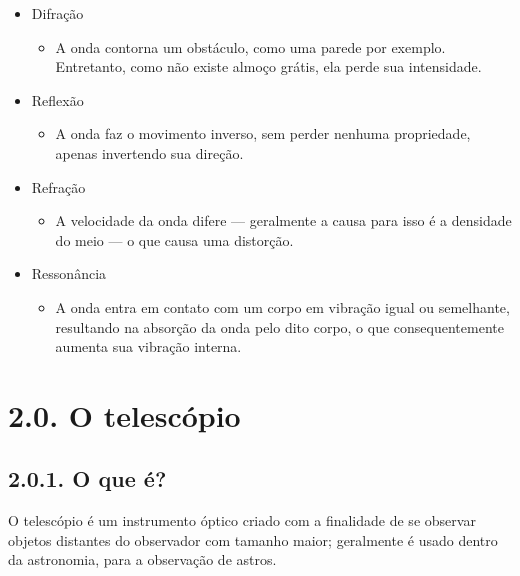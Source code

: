 \documentclass[
  a4paper]{article}
\providecommand{\tightlist}{%
  \setlength{\itemsep}{0pt}\setlength{\parskip}{0pt}}
\begin{document}
\begin{itemize}
\tightlist
\item
  Difração

  \begin{itemize}
  \tightlist
  \item
    A onda contorna um obstáculo, como uma parede por exemplo.\\
    Entretanto, como não existe almoço grátis, ela perde sua
    intensidade.
  \end{itemize}
\item
  Reflexão

  \begin{itemize}
  \tightlist
  \item
    A onda faz o movimento inverso, sem perder nenhuma propriedade,
    apenas invertendo sua direção.
  \end{itemize}
\item
  Refração

  \begin{itemize}
  \tightlist
  \item
    A velocidade da onda difere --- geralmente a causa para isso é a
    densidade do meio --- o que causa uma distorção.
  \end{itemize}
\item
  Ressonância

  \begin{itemize}
  \tightlist
  \item
    A onda entra em contato com um corpo em vibração igual ou
    semelhante, resultando na absorção da onda pelo dito corpo, o que
    consequentemente aumenta sua vibração interna.
  \end{itemize}
\end{itemize}

\hypertarget{o-telescuxf3pio}{%
\section{2.0. O telescópio}\label{o-telescuxf3pio}}

\hypertarget{o-que-uxe9}{%
\subsection{2.0.1. O que é?}\label{o-que-uxe9}}

O telescópio é um instrumento óptico criado com a finalidade de se
observar objetos distantes do observador com tamanho maior; geralmente é
usado dentro da astronomia, para a observação de astros.
\end{document}
